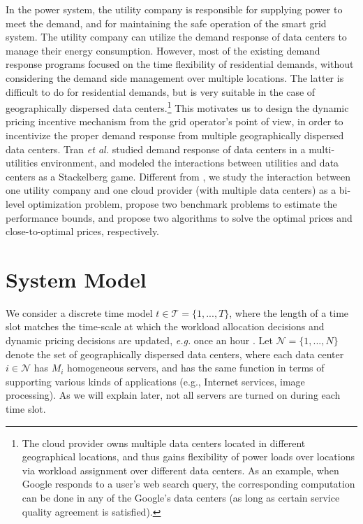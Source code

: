 \documentclass[journal]{IEEEtran}
\begin{document}
	In the power system, the utility company is responsible for supplying power to meet the demand, and for maintaining the safe operation of the smart grid system. The utility company can utilize the demand response of data centers to manage their energy consumption. However, most of the existing demand response programs focused on the time flexibility of residential demands, without considering the demand side management over multiple locations. The latter is difficult to do for residential demands, but is very suitable in the case of geographically dispersed data centers.\footnote{The cloud provider owns multiple data centers located in different geographical locations, and thus gains flexibility of power loads over locations via workload assignment over different data centers. As an example, when Google responds to a user's web search query, the corresponding computation can be done in any of the Google's data centers (as long as certain service quality agreement is satisfied).} This motivates us to design the dynamic pricing incentive mechanism from the grid operator's point of view, in order to incentivize the proper demand response from multiple geographically dispersed data centers. Tran \textit{et al.} \cite{MultiDC} studied demand response of data centers in a multi-utilities environment, and modeled the interactions between utilities and data centers as a Stackelberg game. Different from \cite{MultiDC}, we study the interaction between one utility company and one cloud provider (with multiple data centers) as a bi-level optimization problem, propose two benchmark problems to estimate the performance bounds, and propose two algorithms to solve the optimal prices and close-to-optimal prices, respectively.
	
	
	\section{System Model}
	We consider a discrete time model $t \in \mathcal{T} = \{ 1,...,T \}$, where the length of a time slot matches the time-scale at which the workload allocation decisions and dynamic pricing decisions are updated, \emph{e.g.} once an hour \cite{infocom}. Let $\mathcal{N}=\{1,...,N\}$ denote the set of geographically dispersed data centers, where each data center $i \in \mathcal{N}$ has $M_{i}$ homogeneous servers, and has the same function in terms of supporting various kinds of applications (e.g., Internet services, image processing). As we will explain later, not all servers are turned on during each time slot. 
	
\end{document}

